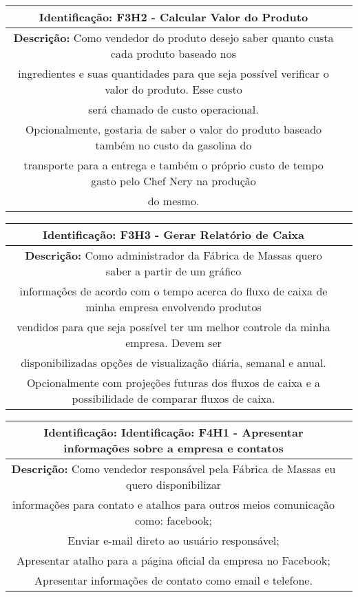     \begin{table}[H]
    \centering
    \begin{tabular}{c|p{10cm}}
    \hline
    \textbf{Identificação:} F3H2 - Calcular Valor do Produto    \\
    \hline
    \textbf{Descrição:} Como vendedor do produto desejo saber quanto custa cada produto baseado nos\\
     ingredientes e suas quantidades para que seja possível verificar o valor do produto. Esse custo\\
      será chamado de custo operacional.\\
	Opcionalmente, gostaria de saber o valor do produto baseado também no custo da gasolina do\\
     transporte para a entrega e também o próprio custo de tempo gasto pelo Chef Nery na produção\\
      do mesmo.  \\
    \end{tabular}
    \end{table}

    \begin{table}[H]
    \centering
    \begin{tabular}{c|p{10cm}}
    \hline
    \textbf{Identificação:} F3H3 - Gerar Relatório de Caixa \\
    \hline
    \textbf{Descrição:} Como administrador da Fábrica de Massas quero saber a partir de um gráfico\\
     informações de acordo com o tempo acerca do fluxo de caixa de minha empresa envolvendo produtos\\
      vendidos para que seja possível ter um melhor controle da minha empresa. Devem ser\\
       disponibilizadas opções de visualização diária, semanal e anual.\\
Opcionalmente com projeções futuras dos fluxos de caixa e a possibilidade de comparar fluxos de caixa.\\
    \hline
    \end{tabular}
    \end{table}

    \begin{table}[H]
    \centering
    \begin{tabular}{c|p{10cm}}
    \hline
    \textbf{Identificação:} Identificação: F4H1 - Apresentar informações sobre a empresa e contatos \\
    \hline
    \textbf{Descrição:} Como vendedor responsável pela Fábrica de Massas eu quero disponibilizar\\
     informações para contato e atalhos para outros meios comunicação como:
      facebook; \\
      Enviar e-mail direto ao usuário responsável;\\
      Apresentar atalho para a página oficial da empresa no Facebook;\\
      Apresentar informações de contato como email e telefone.\\
      \hline
    \end{tabular}
    \end{table}
